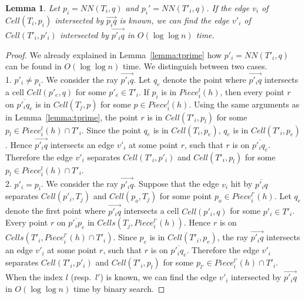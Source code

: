 \documentclass[10pt,a4paper]{amsart}
\newcommand{\ov}[1]{\overline{#1}}
\newcommand{\ovar}[1]{\overrightarrow{#1}}
\newcommand{\Cell}{\mathit{Cell}}
\newcommand{\Cells}{\mathit{Cells}}
\newcommand{\NN}{\mathit{NN}}
\newtheorem{lemma}{Lemma}
\begin{document}
\begin{lemma}
  \label{lemma:tprime2}
  Let $p_i=\NN(T_i,q)$ and $p_i'=\NN(T'_i,q)$. 
  If  the edge $v_i$ of $\Cell(T_i,p_i)$ intersected by $\ovar{p_iq}$ is known, we can find the edge $v'_i$ of $\Cell(T'_i,p'_i)$ intersected by $\ovar{p'_iq}$ in $O(\log \log n)$ time.  
\end{lemma}
\begin{proof}
  We already explained in Lemma~\ref{lemma:tprime} how $p'_i=\NN(T'_i,q)$ can be found in $O(\log\log n)$ time. We distinguish between two cases.\\
  1. $p'_i\not= p_i$.  We consider the ray $\ovar{p'_iq}$. Let $q_e$ denote the point where $\ovar{p'_iq}$ intersects  a cell $\Cell(p'_e,q)$ for some $p'_e\in T'_i$. If  $p_i$ is in $Piece^l_i(h)$, then every point $r$ on $\ov{p'_iq_e}$ is in $\Cell(T_j,p)$ for some $p\in Piece^l_i(h)$. Using the same arguments as in Lemma~\ref{lemma:tprime}, the point $r$ is in $\Cell(T'_i,p_l)$ for some $p_l\in Piece^l_i(h)\cap T'_i$.  Since the point $q_e$ is in $\Cell(T_i,p_e)$, $q_e$ is in $\Cell(T'_i,p_e)$. Hence $\ovar{p'_iq}$ intersects an edge $v'_i$ at some point $r$, such that $r$ is on $\ov{p'_iq_e}$. Therefore the edge $v'_i$ separates $\Cell(T'_i,p'_i)$ and $\Cell(T'_i,p_l)$ for some $p_l\in Piece^l_i(h)\cap T'_i$.\\
  2. $p'_i=p_i$.  We consider  the ray $\ovar{p'_iq}$. Suppose that the edge $v_i$ hit by $\ov{p'_iq}$ separates $\Cell(p'_i,T_j)$ and $\Cell(p_o,T_j)$ for some point $p_o\in Piece^{l'}_i(h)$. Let $q_e$ denote the first point where $\ovar{p'_iq}$ intersects  a cell $\Cell(p'_i,q)$ for some $p'_i\in T'_i$. Every  point $r$  on $\ov{p'_ip_e}$ in $\Cells(T_j,Piece^{l'}_i(h))$. Hence $r$ is on  $\Cells(T'_i,Piece^{l'}_i(h)\cap T'_i)$. Since $p_e$ is in $\Cell(T'_i,p_e)$, the ray  $\ovar{p'_iq}$ intersects an edge $v'_i$ at some point $r$, such that $r$ is on $\ov{p'_iq_e}$. Therefore the edge $v'_i$ separates $\Cell(T'_i,p'_i)$ and $\Cell(T'_i,p_l)$ for some $p_{l'}\in Piece^{l'}_i(h)\cap T'_i$.\\
  When the index $l$ (resp.\ $l'$) is known, we can find the edge $v'_i$ intersected by $\ovar{p'_iq}$ in $O(\log\log n)$ time by binary search. 
\end{proof}
\end{document}
